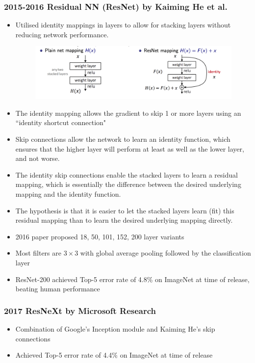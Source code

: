 \subsubsection{2015-2016 Residual NN (ResNet) by Kaiming He et al.}
\begin{itemize}
    \item Utilised identity mappings in layers to allow for stacking layers without reducing network performance.
    \begin{figure}[H]
        \centering
        \includegraphics[width=0.7\linewidth]{img/resnet.png}
        
        
    \end{figure}
    \item The identity mapping allows the gradient to skip 1 or more layers using an ``identity shortcut connection"
    \item Skip connections allow the network to learn an identity function, which ensures that the higher layer will perform at least as well as the lower layer, and not worse.

    \item The identity skip connections enable the stacked layers to learn a residual mapping, which is essentially the difference between the desired underlying mapping and the identity function.
    
    \item The hypothesis is that it is easier to let the stacked layers learn (fit) this residual mapping than to learn the desired underlying mapping directly. 


    \item 2016 paper proposed 18, 50, 101, 152, 200 layer variants
    \item Most filters are $3 \times 3$ with global average pooling followed by the classification layer
    \item ResNet-200 achieved Top-5 error rate of 4.8\% on ImageNet at time of release, beating human performance
\end{itemize}

\subsubsection{2017 ResNeXt by Microsoft Research}
\begin{itemize}
    \item Combination of Google's Inception module and Kaiming He's skip connections
    \item Achieved Top-5 error rate of 4.4\% on ImageNet at time of release
\end{itemize}


